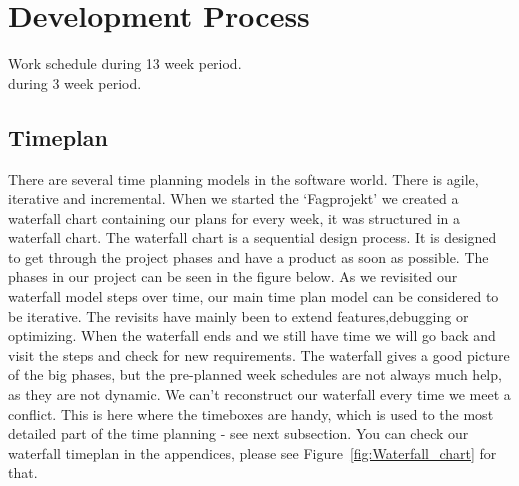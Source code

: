 \chapter{Development Process}
Work schedule during 13 week period.\\
during 3 week period.

\section{Timeplan}%
There are several time planning models in the software world. There is agile, iterative and incremental.
\newline
When we started the `Fagprojekt' we created a waterfall chart containing our plans for every week, it was structured in a waterfall chart. The waterfall chart is a sequential design process. It is designed to get through the project phases and have a product as soon as possible. The phases in our project can be seen in the figure below.
\newline
As we revisited our waterfall model steps over time, our main time plan model can be considered to be iterative. The revisits have mainly been to extend features,debugging or optimizing.
\newline
When the waterfall ends and we still have time
we will go back and visit the steps and check for new requirements.
\newline
The waterfall gives a good picture of the big phases, but the pre-planned week schedules are not always much help, as they are not dynamic. We can't reconstruct our waterfall every time we meet a conflict. This is here where the timeboxes are handy, which is used to the most detailed part of the time planning - see next subsection. You can check our waterfall timeplan in the appendices, please see Figure~\ref{fig:Waterfall_chart} for that.
